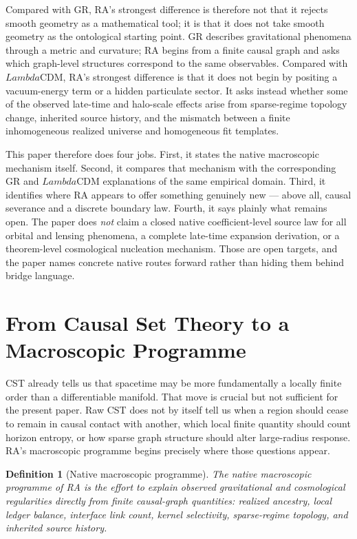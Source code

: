 \documentclass[11pt]{article}
\def\Lambda{Lambda}%
\newtheorem{definition}{Definition}
\begin{document}
Compared with GR, RA's strongest difference is therefore not that it rejects smooth geometry as a mathematical tool; it is that it does not take smooth geometry as the ontological starting point. GR describes gravitational phenomena through a metric and curvature; RA begins from a finite causal graph and asks which graph-level structures correspond to the same observables. Compared with $\Lambda$CDM, RA's strongest difference is that it does not begin by positing a vacuum-energy term or a hidden particulate sector. It asks instead whether some of the observed late-time and halo-scale effects arise from sparse-regime topology change, inherited source history, and the mismatch between a finite inhomogeneous realized universe and homogeneous fit templates.

This paper therefore does four jobs. First, it states the native macroscopic mechanism itself. Second, it compares that mechanism with the corresponding GR and $\Lambda$CDM explanations of the same empirical domain. Third, it identifies where RA appears to offer something genuinely new --- above all, causal severance and a discrete boundary law. Fourth, it says plainly what remains open. The paper does \emph{not} claim a closed native coefficient-level source law for all orbital and lensing phenomena, a complete late-time expansion derivation, or a theorem-level cosmological nucleation mechanism. Those are open targets, and the paper names concrete native routes forward rather than hiding them behind bridge language.

\section{From Causal Set Theory to a Macroscopic Programme}

CST already tells us that spacetime may be more fundamentally a locally finite order than a differentiable manifold. That move is crucial but not sufficient for the present paper. Raw CST does not by itself tell us when a region should cease to remain in causal contact with another, which local finite quantity should count horizon entropy, or how sparse graph structure should alter large-radius response. RA's macroscopic programme begins precisely where those questions appear.

\begin{definition}[Native macroscopic programme]
The \emph{native macroscopic programme} of RA is the effort to explain observed gravitational and cosmological regularities directly from finite causal-graph quantities: realized ancestry, local ledger balance, interface link count, kernel selectivity, sparse-regime topology, and inherited source history.
\end{definition}
\end{document}
